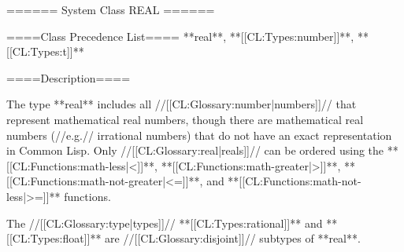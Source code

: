 ====== System Class REAL ======

====Class Precedence List====
**real**, **[[CL:Types:number]]**, **[[CL:Types:t]]**

====Description====

The type **real** includes all //[[CL:Glossary:number|numbers]]// that represent mathematical real numbers, though there are mathematical real numbers (//e.g.// irrational numbers) that do not have an exact representation in Common Lisp. Only //[[CL:Glossary:real|reals]]// can be ordered using the **[[CL:Functions:math-less|<]]**, **[[CL:Functions:math-greater|>]]**, **[[CL:Functions:math-not-greater|<=]]**, and **[[CL:Functions:math-not-less|>=]]** functions.

The //[[CL:Glossary:type|types]]// **[[CL:Types:rational]]** and **[[CL:Types:float]]** are //[[CL:Glossary:disjoint]]// subtypes of **real**.


 

